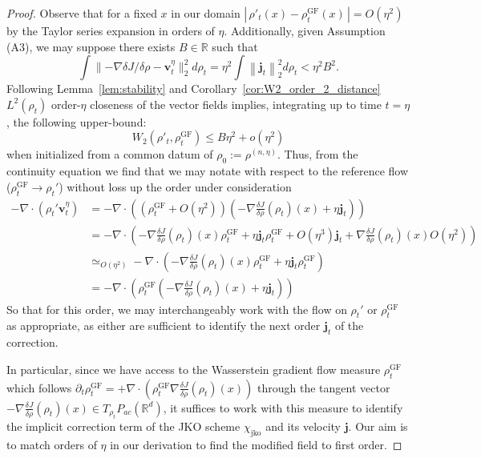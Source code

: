 \documentclass[reqno,11pt,letterpaper]{amsart}
\theoremstyle{plain}
\theoremstyle{definition}
\theoremstyle{remark}
\newcommand{\mb}{\mathbf}
\newcommand{\wass}{\mathrm{GF}}
\newcommand{\wagrad}{\nabla \frac{\delta J}{\delta \rho}}
\newcommand{\jkoreg}{\chi_{\mathrm{jko}}}
\begin{document}
\begin{proof}
Observe that for a fixed $x$ in our domain $|\,\rho'_{t}(x) - \rho_{t}^{\wass}(x) \,|  = O(\eta^{2}) \,\,$ by the Taylor series expansion in orders of $\eta$. Additionally, given Assumption (A3), we may suppose there exists $B \in \mathbb{R}$ such that
\[
\int \lVert -\nabla \delta J/\delta \rho - \mb{v}^{\eta}_{t} \rVert_{2}^{2}d\rho_{t} = 
\eta^{2} \int \left\lVert \bm{j}_{t} \right\rVert_{2}^{2}d\rho_{t} < \eta^{2} B^{2}.
\]
Following Lemma~\ref{lem:stability} and Corollary~\ref{cor:W2_order_2_distance}
$L^{2}(\rho_{t})$ order-$\eta$ closeness of the vector fields implies, integrating up to time $t=\eta$, the following upper-bound:
\[
W_2 (\rho'_t , \rho^{\wass}_t) \leq B\eta^{2} + o(\eta^{2})
\]
when initialized from a common datum of $\rho_{0}:=\rho^{(n,\eta)}$. Thus, from the continuity equation we find that we may notate with respect to the reference flow ($\rho_{t}^{\wass} \to \rho_{t}'$) without loss up the order under consideration
\begin{align}
    - \nabla \cdot ( \rho_{t}' \mathbf{v}_{t}^{\eta}) &= - \nabla \cdot \left(\left(\rho_{t}^{\wass} + O(\eta^{2}) \right) \left(- \wagrad (\rho_{t})(x) + \eta \bm{j}_{t} \right) \right) \\
    &= - \nabla \cdot \left(
    - \wagrad (\rho_{t})(x)\rho_{t}^{\wass} + \eta \bm{j}_{t} \rho_{t}^{\wass} +O(\eta^{3}) \bm{j}_{t} + \wagrad (\rho_{t})(x)O(\eta^{2}) \right) \\
    & \simeq_{O(\eta^{2})} - \nabla \cdot \left(
    - \wagrad (\rho_{t})(x)\rho_{t}^{\wass} + \eta \bm{j}_{t} \rho_{t}^{\wass} \right) \\
    &= - \nabla \cdot \left( \rho_{t}^{\wass} \left(
    - \wagrad (\rho_{t})(x) + \eta \bm{j}_{t} \right) \right)
\end{align}
So that for this order, we may interchangeably work with the flow on $\rho_{t}'$ or $\rho_{t}^{\wass}$ as appropriate, as either are sufficient to identify the next order $\bm{j}_{t}$ of the correction.

In particular, since we have access to the Wasserstein gradient flow measure $\rho_{t}^{\wass}$ which follows $\partial_{t} \rho_{t}^{\wass} = + \nabla \cdot (\rho_{t}^{\wass}  \wagrad (\rho_{t})(x))$ through the tangent vector $-\wagrad (\rho_{t})(x) \in T_{\rho_{t}} {P}_{ac}(\mathbb{R}^{d})$, it suffices to work with this measure to identify the implicit correction term of the JKO scheme $\jkoreg$ and its velocity $\bm{j}$. Our aim is to match orders of $\eta$ in our derivation to find the modified field to first order. 


\end{proof}
\end{document}
